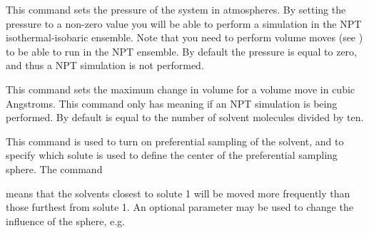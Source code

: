 \documentclass[letterpaper,10pt,english]{sphinxmanual}
\begin{document}
\ignorespaces 
\def\sphinxLiteralBlockLabel{\label{\detokenize{protoms:index-38}}}
%
\begin{sphinxVerbatim}[commandchars=\\\{\}]
 
\end{sphinxVerbatim}

This command sets the pressure of the system in atmospheres. By setting the pressure to a non-zero value you will be able to perform a simulation in the NPT isothermal-isobaric ensemble. Note that you need to perform volume moves (see {\hyperref[\detokenize{protoms:moves}]{}}) to be able to run in the NPT ensemble. By default the pressure is equal to zero, and thus a NPT simulation is not performed.

\ignorespaces 
\def\sphinxLiteralBlockLabel{\label{\detokenize{protoms:index-39}}}
%
\begin{sphinxVerbatim}[commandchars=\\\{\}]
 
\end{sphinxVerbatim}

This command sets the maximum change in volume for a volume move in cubic Angstroms. This command only has meaning if an NPT simulation is being performed. By default  is equal to the number of solvent molecules divided by ten.

%
\begin{sphinxVerbatim}[commandchars=\\\{\}]
 
\end{sphinxVerbatim}

This command is used to turn on preferential sampling of the solvent, and to specify which solute is used to define the center of the preferential sampling sphere. The command

\ignorespaces 
\def\sphinxLiteralBlockLabel{\label{\detokenize{protoms:index-40}}}
%
\begin{sphinxVerbatim}[commandchars=\\\{\}]
 
\end{sphinxVerbatim}

means that the solvents closest to solute 1 will be moved more frequently than those furthest from solute 1. An optional parameter may be used to change the influence of the sphere, e.g.
\end{document}
